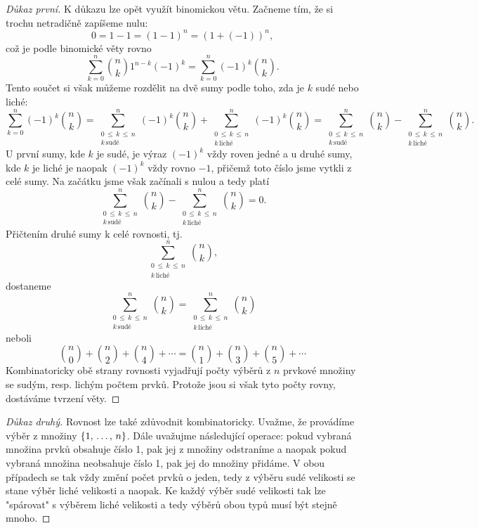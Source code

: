 \begin{proof}[Důkaz první]
    K důkazu lze opět využít binomickou větu. Začneme tím, že si trochu netradičně zapíšeme nulu:
    \[0=1-1=(1-1)^n=(1+(-1))^n,\]
    což je podle binomické věty rovno
    \[\sum_{k=0}^{n}\binom{n}{k}1^{n-k}(-1)^k=\sum_{k=0}^{n}(-1)^k\binom{n}{k}.\]
    Tento součet si však můžeme rozdělit na dvě sumy podle toho, zda je $k$ sudé nebo liché:
    \[\sum_{k=0}^{n}(-1)^k\binom{n}{k}=\sum_{\substack{0\,\leqslant\,k\,\leqslant\,n \\ k\,\text{sudé}}}^{n}(-1)^k\binom{n}{k}+\sum_{\substack{0\,\leqslant\,k\,\leqslant\,n \\ k\,\text{liché}}}^{n}(-1)^k\binom{n}{k}=\sum_{\substack{0\,\leqslant\,k\,\leqslant\,n \\ k\,\text{sudé}}}^{n}\binom{n}{k}-\sum_{\substack{0\,\leqslant\,k\,\leqslant\,n \\ k\,\text{liché}}}^{n}\binom{n}{k}.\]
    U první sumy, kde $k$ je sudé, je výraz $(-1)^k$ vždy roven jedné a u druhé sumy, kde $k$ je liché je naopak $(-1)^k$ vždy rovno $-1$, přičemž toto číslo jsme vytkli z celé sumy. Na začátku jsme však začínali s nulou a tedy platí
    \[\sum_{\substack{0\,\leqslant\,k\,\leqslant\,n \\ k\,\text{sudé}}}^{n}\binom{n}{k}-\sum_{\substack{0\,\leqslant\,k\,\leqslant\,n \\ k\,\text{liché}}}^{n}\binom{n}{k}=0.\]
    Přičtením druhé sumy k celé rovnosti, tj.
    \[\sum_{\substack{0\,\leqslant\,k\,\leqslant\,n \\ k\,\text{liché}}}^{n}\binom{n}{k},\]
    dostaneme
    \[\sum_{\substack{0\,\leqslant\,k\,\leqslant\,n \\ k\,\text{sudé}}}^{n}\binom{n}{k}=\sum_{\substack{0\,\leqslant\,k\,\leqslant\,n \\ k\,\text{liché}}}^{n}\binom{n}{k}\]
    neboli
    \[\binom{n}{0}+\binom{n}{2}+\binom{n}{4}+\cdots=\binom{n}{1}+\binom{n}{3}+\binom{n}{5}+\cdots\]
    Kombinatoricky obě strany rovnosti vyjadřují počty výběrů z $n$ prvkové množiny se sudým, resp. lichým počtem prvků. Protože jsou si však tyto počty rovny, dostáváme tvrzení věty.
\end{proof}
\begin{proof}[Důkaz druhý]
    Rovnost lze také zdůvodnit kombinatoricky. Uvažme, že provádíme výběr z množiny $\left\{1,\,\dots,\,n\right\}$. Dále uvažujme následující operace: pokud vybraná množina prvků obsahuje číslo 1, pak jej z množiny odstraníme a naopak pokud vybraná množina neobsahuje číslo 1, pak jej do množiny přidáme. V obou případech se tak vždy změní počet prvků o jeden, tedy z výběru sudé velikosti se stane výběr liché velikosti a naopak. Ke každý výběr sudé velikosti tak lze "spárovat" s výběrem liché velikosti a tedy výběrů obou typů musí být stejně mnoho.
\end{proof}